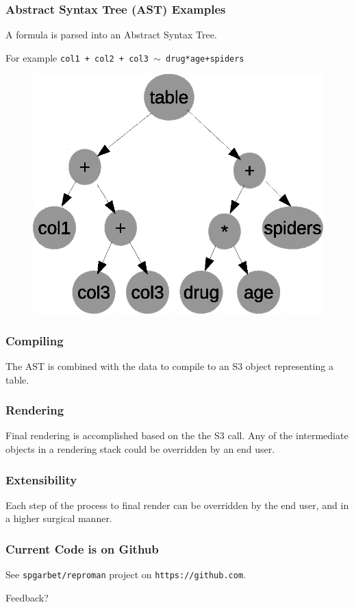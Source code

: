 \documentclass{beamer}
\begin{document}
  \begin{frame}
    \frametitle{Abstract Syntax Tree (AST) Examples}
    A formula is parsed into an Abstract Syntax Tree.

    For example \texttt{col1 + col2 + col3 $\sim$ drug*age+spiders}  
    \begin{figure}
      \includegraphics[scale=0.5]{ast1.eps}
    \end{figure}
  \end{frame}      

  \begin{frame}
    \frametitle{Compiling}
    The AST is combined with the data to compile to an S3 object representing a table.
  \end{frame}      

  \begin{frame}
    \frametitle{Rendering}
    Final rendering is accomplished based on the the S3 call. Any of the intermediate objects in a rendering stack could be overridden by an end user.
  \end{frame}      

  \begin{frame}
    \frametitle{Extensibility}
    Each step of the process to final render can be overridden by the end user, and in a higher surgical manner.
  \end{frame}

  \begin{frame}
    \frametitle{Current Code is on Github}
    See \texttt{spgarbet/reproman} project on \texttt{https://github.com}.


    Feedback?
  \end{frame}
\end{document}
